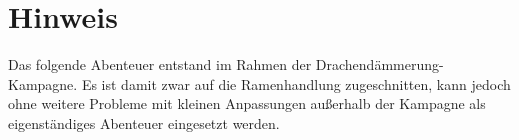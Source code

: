 \section*{Hinweis}
\par Das folgende Abenteuer entstand im Rahmen der Drachendämmerung-Kampagne. Es ist damit zwar auf die Ramenhandlung zugeschnitten, kann jedoch ohne weitere Probleme mit kleinen Anpassungen außerhalb der Kampagne als eigenständiges Abenteuer eingesetzt werden.
